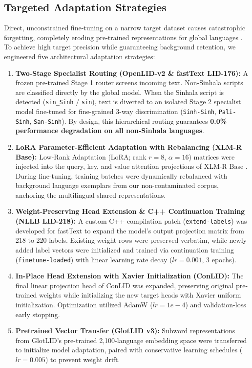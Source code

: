 \documentclass[11pt]{article}
\begin{document}
\subsection{Targeted Adaptation Strategies}
Direct, unconstrained fine-tuning on a narrow target dataset causes catastrophic forgetting, completely eroding pre-trained representations for global languages \cite{mccloskey1989catastrophic,french1999catastrophic,kirkpatrick2017overcoming}. To achieve high target precision while guaranteeing background retention, we engineered five architectural adaptation strategies:
\begin{enumerate}
    \item \textbf{Two-Stage Specialist Routing (OpenLID-v2 \& fastText LID-176):} A frozen pre-trained Stage 1 router screens incoming text. Non-Sinhala scripts are classified directly by the global model. When the Sinhala script is detected (\texttt{sin\_Sinh} / \texttt{sin}), text is diverted to an isolated Stage 2 specialist model fine-tuned for fine-grained 3-way discrimination (\texttt{Sinh-Sinh}, \texttt{Pali-Sinh}, \texttt{San-Sinh}). By design, this hierarchical routing guarantees \textbf{0.0\% performance degradation on all non-Sinhala languages}.
    \item \textbf{LoRA Parameter-Efficient Adaptation with Rebalancing (XLM-R Base):} Low-Rank Adaptation (LoRA; rank $r=8$, $\alpha=16$) matrices were injected into the query, key, and value attention projections of XLM-R Base \cite{hu2022lora}. During fine-tuning, training batches were dynamically rebalanced with background language exemplars from our non-contaminated corpus, anchoring the multilingual shared representations.
    \item \textbf{Weight-Preserving Head Extension \& C++ Continuation Training (NLLB LID-218):} A custom C++ compilation patch (\texttt{extend-labels}) was developed for fastText to expand the model's output projection matrix from 218 to 220 labels. Existing weight rows were preserved verbatim, while newly added label vectors were initialized and trained via continuation training (\texttt{finetune-loaded}) with linear learning rate decay ($lr=0.001$, 3 epochs).
    \item \textbf{In-Place Head Extension with Xavier Initialization (ConLID):} The final linear projection head of ConLID was expanded, preserving original pre-trained weights while initializing the new target heads with Xavier uniform initialization. Optimization utilized AdamW ($lr=1e-4$) and validation-loss early stopping.
    \item \textbf{Pretrained Vector Transfer (GlotLID v3):} Subword representations from GlotLID's pre-trained 2,100-language embedding space were transferred to initialize model adaptation, paired with conservative learning schedules ($lr=0.005$) to prevent weight drift.
\end{enumerate}
\end{document}
